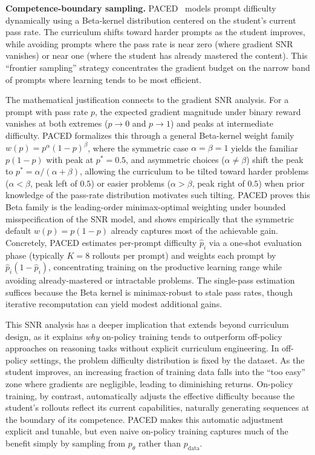 \documentclass{article} %
\newcommand{\ptheta}{p_\theta}
\newcommand{\pdata}{p_{\mathrm{data}}}
\begin{document}
\textbf{Competence-boundary sampling.} PACED~\citep{2603.11178} models prompt difficulty dynamically using a Beta-kernel distribution centered on the student's current pass rate. The curriculum shifts toward harder prompts as the student improves, while avoiding prompts where the pass rate is near zero (where gradient SNR vanishes) or near one (where the student has already mastered the content). This ``frontier sampling'' strategy concentrates the gradient budget on the narrow band of prompts where learning tends to be most efficient.

The mathematical justification connects to the gradient SNR analysis. For a prompt with pass rate $p$, the expected gradient magnitude under binary reward vanishes at both extremes ($p \to 0$ and $p \to 1$) and peaks at intermediate difficulty. PACED formalizes this through a general Beta-kernel weight family $w(p) = p^\alpha(1-p)^\beta$, where the symmetric case $\alpha = \beta = 1$ yields the familiar $p(1-p)$ with peak at $p^* = 0.5$, and asymmetric choices ($\alpha \neq \beta$) shift the peak to $p^* = \alpha/(\alpha + \beta)$, allowing the curriculum to be tilted toward harder problems ($\alpha < \beta$, peak left of $0.5$) or easier problems ($\alpha > \beta$, peak right of $0.5$) when prior knowledge of the pass-rate distribution motivates such tilting. PACED proves this Beta family is the leading-order minimax-optimal weighting under bounded misspecification of the SNR model, and shows empirically that the symmetric default $w(p) = p(1-p)$ already captures most of the achievable gain. Concretely, PACED estimates per-prompt difficulty $\hat{p}_i$ via a one-shot evaluation phase (typically $K{=}8$ rollouts per prompt) and weights each prompt by $\hat{p}_i (1 - \hat{p}_i)$, concentrating training on the productive learning range while avoiding already-mastered or intractable problems. The single-pass estimation suffices because the Beta kernel is minimax-robust to stale pass rates, though iterative recomputation can yield modest additional gains.

This SNR analysis has a deeper implication that extends beyond curriculum design, as it explains \emph{why} on-policy training tends to outperform off-policy approaches on reasoning tasks without explicit curriculum engineering. In off-policy settings, the problem difficulty distribution is fixed by the dataset. As the student improves, an increasing fraction of training data falls into the ``too easy'' zone where gradients are negligible, leading to diminishing returns. On-policy training, by contrast, automatically adjusts the effective difficulty because the student's rollouts reflect its current capabilities, naturally generating sequences at the boundary of its competence. PACED makes this automatic adjustment explicit and tunable, but even naive on-policy training captures much of the benefit simply by sampling from $\ptheta$ rather than $\pdata$.
\end{document}
